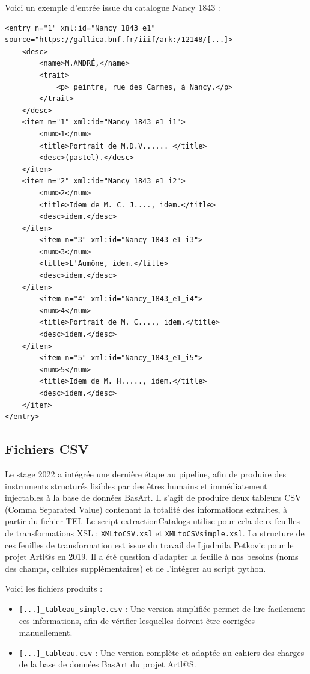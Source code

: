 \documentclass[a4paper,12pt,twoside]{book}
\begin{document}
Voici un exemple d'entrée issue du catalogue Nancy 1843 :
\begin{footnotesize}
	\begin{verbatim}
<entry n="1" xml:id="Nancy_1843_e1" source="https://gallica.bnf.fr/iiif/ark:/12148/[...]>
	<desc>
		<name>M.ANDRÉ,</name>
		<trait>
			<p> peintre, rue des Carmes, à Nancy.</p>
		</trait>
	</desc>
	<item n="1" xml:id="Nancy_1843_e1_i1">
		<num>1</num>
		<title>Portrait de M.D.V...... </title>
		<desc>(pastel).</desc>
	</item>
	<item n="2" xml:id="Nancy_1843_e1_i2">
		<num>2</num>
		<title>Idem de M. C. J...., idem.</title>
		<desc>idem.</desc>
	</item>
		<item n="3" xml:id="Nancy_1843_e1_i3">
		<num>3</num>
		<title>L'Aumône, idem.</title>
		<desc>idem.</desc>
	</item>
		<item n="4" xml:id="Nancy_1843_e1_i4">
		<num>4</num>
		<title>Portrait de M. C...., idem.</title>
		<desc>idem.</desc>
	</item>
		<item n="5" xml:id="Nancy_1843_e1_i5">
		<num>5</num>
		<title>Idem de M. H....., idem.</title>
		<desc>idem.</desc>
	</item>
</entry>
	\end{verbatim}
\end{footnotesize}



\subsection{Fichiers CSV}

Le stage 2022 a intégrée une dernière étape au pipeline, afin de produire des instruments structurés lisibles par des êtres humains et immédiatement injectables à la base de données BasArt. Il s'agit de produire deux tableurs CSV (Comma Separated Value) contenant la totalité des informations extraites, à partir du fichier TEI. Le script extractionCatalogs utilise pour cela deux feuilles de transformations XSL : \texttt{XMLtoCSV.xsl} et \texttt{XMLtoCSVsimple.xsl}. La structure de ces feuilles de transformation est issue du travail de Ljudmila Petkovic pour le projet Artl@s en 2019. Il a été question d'adapter la feuille à nos besoins (noms des champs, cellules supplémentaires) et de l'intégrer au script python. 

Voici les fichiers produits : 
\begin{itemize}
\item \texttt{[...]\_tableau\_simple.csv} : Une version simplifiée permet de lire facilement ces informations, afin de vérifier lesquelles doivent être corrigées manuellement.

\item \texttt{[...]\_tableau.csv} : Une version complète et adaptée au cahiers des charges de la base de données BasArt du projet Artl@S.
\end{itemize}
\end{document}
